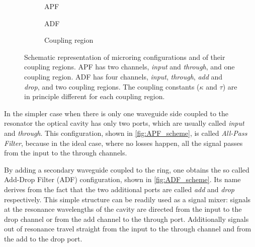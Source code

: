\begin{figure}[ht]
	\centering
	\begin{subfigure}[b]{0.3\textwidth}
		\centering
		
		\caption{APF}
		\label{fig:APF_scheme}
	\end{subfigure}
	\hspace{.02\textwidth}
	\begin{subfigure}[b]{0.3\textwidth}
		\centering
		
		\caption{ADF}
		\label{fig:ADF_scheme}
	\end{subfigure}
	\hspace{.02\textwidth}
	\begin{subfigure}[b]{0.3\textwidth}
		\centering
		
		\caption{Coupling region}
		\label{fig:coupling_scheme}
	\end{subfigure}
	
	\caption{
		Schematic representation of microring configurations and of their coupling regions.
		APF has two channels, \textit{input} and \textit{through}, and one coupling region.
		ADF has four channels, \textit{input}, \textit{through}, \textit{add} and \textit{drop}, and two coupling regions.
		The coupling constants ($\kappa$ and $\tau$) are in principle different for each coupling region.
	}
	\label{fig:resonator_theory}
\end{figure}

In the simpler case when there is only one waveguide side coupled to the resonator the optical cavity has only two ports, which are usually called \textit{input} and \textit{through}.
This configuration, shown in \autoref{fig:APF_scheme}, is called \textit{All-Pass Filter}, because in the ideal case, where no losses happen, all the signal passes from the input to the through channels.

By adding a secondary waveguide coupled to the ring, one obtains the so called Add-Drop Filter (ADF) configuration, shown in \autoref{fig:ADF_scheme}.
Its name derives from the fact that the two additional ports are called \textit{add} and \textit{drop} respectively.
This simple structure can be readily used as a signal mixer: signals at the resonance wavelengths of the cavity are directed from the input to the drop channel or from the add channel to the through port.
Additionally signals out of resonance travel straight from the input to the through channel and from the add to the drop port.

